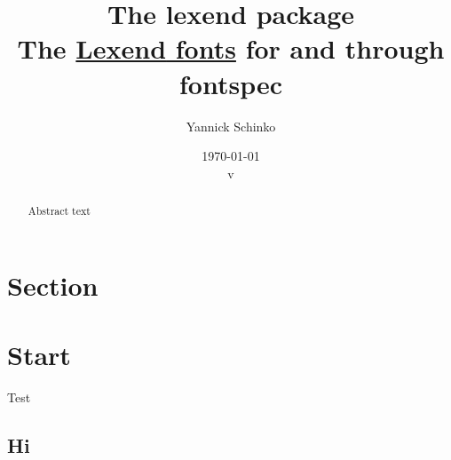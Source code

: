 \documentclass[12pt,oneside,a4paper]{ltxdoc}
\begin{document}
\title{
	The \textsf{lexend} package\\
	\small{The \href{https://www.lexend.com/}{\textsf{Lexend} fonts} for  and  through \textsf{fontspec}}
}
\author{
	Yannick Schinko
}
\date{
	\today\\
	v%
}

\maketitle

\begin{abstract}
Abstract text
\end{abstract}
\newpage

\tableofcontents
\newpage


\section{Section}


\section{Start}

Test

\subsection{Hi}
\end{document}
